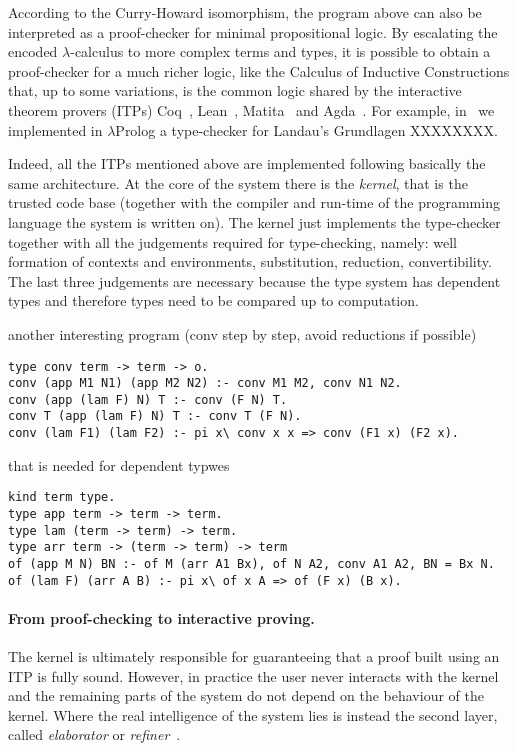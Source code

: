 \documentclass{easychair}
\begin{document}
According to the Curry-Howard isomorphism, the program above can also
be interpreted as a proof-checker for minimal propositional logic. By
escalating the encoded $\lambda$-calculus to more complex terms and
types, it is possible to obtain a proof-checker for a much richer
logic, like the Calculus of Inductive Constructions that, up to some
variations, is the common logic shared by the interactive theorem
provers (ITPs) Coq~\cite{}, Lean~\cite{}, Matita~\cite{} and
Agda~\cite{}. For example, in~\cite{us} we implemented in
$\lambda$Prolog a type-checker for Landau's Grundlagen XXXXXXXX.

Indeed, all the ITPs mentioned above are implemented following
basically the same architecture. At the core of the system there is
the \emph{kernel}, that is the trusted code base (together with the
compiler and run-time of the programming language the system is
written on). The kernel just implements the type-checker together with
all the judgements required for type-checking, namely: well formation
of contexts and environments, substitution, reduction, convertibility.
The last three judgements are necessary because the type system has
dependent types and therefore types need to be compared up to
computation.

another interesting program (conv step by step, avoid reductions if
possible)

\begin{verbatim}
type conv term -> term -> o.
conv (app M1 N1) (app M2 N2) :- conv M1 M2, conv N1 N2.
conv (app (lam F) N) T :- conv (F N) T.
conv T (app (lam F) N) T :- conv T (F N).
conv (lam F1) (lam F2) :- pi x\ conv x x => conv (F1 x) (F2 x).
\end{verbatim}

that is needed for dependent typwes

\begin{verbatim}
kind term type.
type app term -> term -> term.
type lam (term -> term) -> term.
type arr term -> (term -> term) -> term
of (app M N) BN :- of M (arr A1 Bx), of N A2, conv A1 A2, BN = Bx N.
of (lam F) (arr A B) :- pi x\ of x A => of (F x) (B x).
\end{verbatim}

\paragraph{From proof-checking to interactive proving.}

The kernel is ultimately responsible for guaranteeing that a proof
built using an ITP is fully sound. However, in practice the user never
interacts with the kernel and the remaining parts of the system do not
depend on the behaviour of the kernel. Where the real intelligence of
the system lies is instead the second layer, called \emph{elaborator}
or \emph{refiner}~\cite{??,??,??}.
\end{document}
